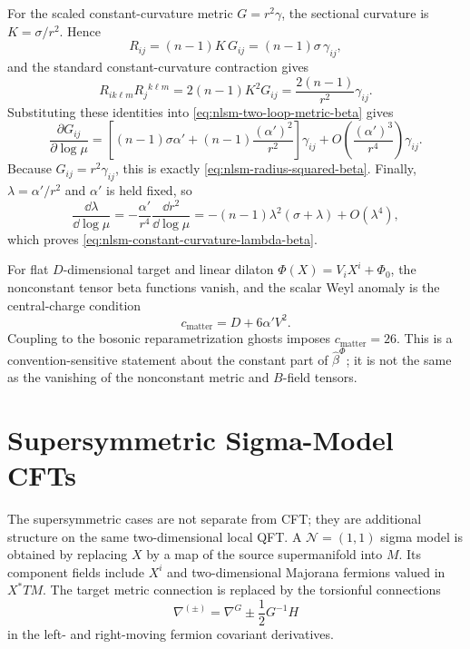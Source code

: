 For the scaled constant-curvature metric \(G=r^2\gamma\), the sectional
curvature is \(K=\sigma/r^2\).  Hence
\begin{equation}
  R_{ij}
  =
  (n-1)K\,G_{ij}
  =
  (n-1)\sigma\,\gamma_{ij},
  \label{eq:nlsm-constant-curvature-ricci}
\end{equation}
and the standard constant-curvature contraction gives
\begin{equation}
  R_{ik\ell m}R_j{}^{k\ell m}
  =
  2(n-1)K^2G_{ij}
  =
  \frac{2(n-1)}{r^2}\gamma_{ij}.
  \label{eq:nlsm-constant-curvature-riemann-square}
\end{equation}
Substituting these identities into
\eqref{eq:nlsm-two-loop-metric-beta} gives
\[
  \frac{\partial G_{ij}}{\partial\log\mu}
  =
  \left[
    (n-1)\sigma\alpha'
    +
    (n-1)\frac{(\alpha')^2}{r^2}
  \right]\gamma_{ij}
  +
  O\!\left(\frac{(\alpha')^3}{r^4}\right)\gamma_{ij}.
\]
Because \(G_{ij}=r^2\gamma_{ij}\), this is exactly
\eqref{eq:nlsm-radius-squared-beta}.  Finally,
\(\lambda=\alpha'/r^2\) and \(\alpha'\) is held fixed, so
\[
  \frac{\dd\lambda}{\dd\log\mu}
  =
  -\frac{\alpha'}{r^4}
  \frac{\dd r^2}{\dd\log\mu}
  =
  -(n-1)\lambda^2(\sigma+\lambda)+O(\lambda^4),
\]
which proves \eqref{eq:nlsm-constant-curvature-lambda-beta}.

\begin{remark}
\label{rem:nlsm-linear-dilaton-criticality}
For flat \(D\)-dimensional target and linear dilaton
\(\Phi(X)=V_iX^i+\Phi_0\), the nonconstant tensor beta functions vanish, and
the scalar Weyl anomaly is the central-charge condition
\[
  c_{\mathrm{matter}}
  =
  D+6\alpha' V^2 .
\]
Coupling to the bosonic reparametrization ghosts imposes
\(c_{\mathrm{matter}}=26\).  This is a convention-sensitive statement about
the constant part of \(\widehat\beta^\Phi\); it is not the same as the
vanishing of the nonconstant metric and \(B\)-field tensors.
\end{remark}

\section{Supersymmetric Sigma-Model CFTs}

The supersymmetric cases are not separate from CFT; they are additional
structure on the same two-dimensional local QFT.  A
\(\mathcal N=(1,1)\) sigma model is obtained by replacing \(X\) by a map of
the source supermanifold into \(M\).  Its component fields include \(X^i\)
and two-dimensional Majorana fermions valued in \(X^*TM\).  The target metric
connection is replaced by the torsionful connections
\[
  \nabla^{(\pm)}=\nabla^G\pm\frac12G^{-1}H
\]
in the left- and right-moving fermion covariant derivatives.


